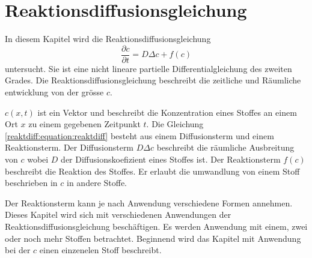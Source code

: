 %
%
%
%
\chapter{Reaktionsdiffusionsgleichung\label{chapter:reaktdiff}}
\begin{refsection}

In diesem Kapitel wird die Reaktionsdiffusionsgleichung
\begin{equation}
\label{reaktdiff:equation:reaktdiff}
\frac{\partial c}{\partial t} = D \Delta c + f(c)
\end{equation}
untersucht.
Sie ist eine nicht lineare partielle Differentialgleichung des zweiten Grades.
Die Reaktionsdiffusionsgleichung beschreibt die zeitliche und Räumliche entwicklung von der grösse \(c\).

\(c(x,t)\) ist ein Vektor und beschreibt die Konzentration eines Stoffes an einem Ort \(x\) zu einem gegebenen Zeitpunkt \(t\).
Die Gleichung \ref{reaktdiff:equation:reaktdiff} besteht aus einem Diffusionsterm und einem Reaktionsterm.
Der Diffusionsterm \(D \Delta c\) beschreibt die räumliche Ausbreitung von \(c\) wobei \(D\) der Diffusionskoefizient eines Stoffes ist.
Der Reaktionsterm \(f(c)\) beschreibt die Reaktion des Stoffes.
Er erlaubt die umwandlung von einem Stoff beschrieben in \(c\) in andere Stoffe.

Der Reaktionsterm kann je nach Anwendung verschiedene Formen annehmen.
Dieses Kapitel wird sich mit verschiedenen Anwendungen der Reaktionsdiffusionsgleichung beschäftigen.
Es werden Anwendung mit einem, zwei oder noch mehr Stoffen betrachtet.
Beginnend wird das Kapitel mit Anwendung bei der \(c\) einen einzenelen Stoff beschreibt.






\printbibliography[heading=subbibliography]
\end{refsection}
